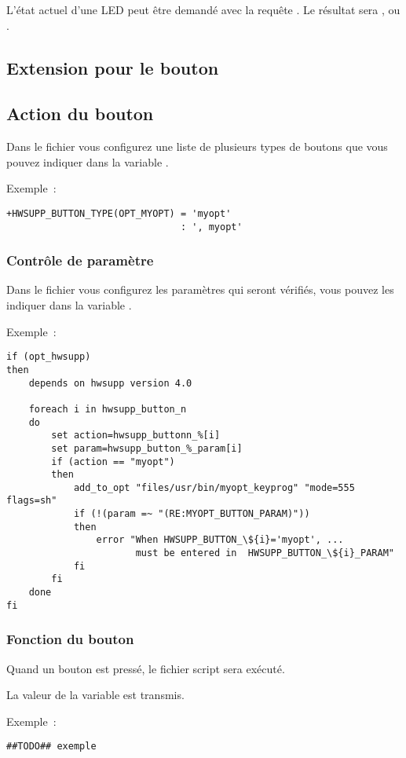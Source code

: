   L'état actuel d'une LED peut être demandé avec la requête
  . Le résultat sera
  ,  ou .

\subsection{Extension pour le bouton}
\subsection{Action du bouton}
  Dans le fichier  vous configurez une liste de plusieurs types
  de boutons que vous pouvez indiquer dans la variable .

Exemple~:
\begin{verbatim}
+HWSUPP_BUTTON_TYPE(OPT_MYOPT) = 'myopt' 
                               : ', myopt'
\end{verbatim}

\subsubsection{Contrôle de paramètre}
  Dans le fichier  vous configurez les paramètres qui seront vérifiés,
  vous pouvez les indiquer dans la variable .

Exemple~:
\begin{verbatim}
if (opt_hwsupp)
then
    depends on hwsupp version 4.0

    foreach i in hwsupp_button_n
    do
        set action=hwsupp_buttonn_%[i]
        set param=hwsupp_button_%_param[i]
        if (action == "myopt")
        then
            add_to_opt "files/usr/bin/myopt_keyprog" "mode=555 flags=sh"
            if (!(param =~ "(RE:MYOPT_BUTTON_PARAM)"))
            then
                error "When HWSUPP_BUTTON_\${i}='myopt', ...
                       must be entered in  HWSUPP_BUTTON_\${i}_PARAM" 
            fi
        fi
    done
fi
\end{verbatim}

\subsubsection {Fonction du bouton}
  Quand un bouton est pressé, le fichier script 
  sera exécuté.

  La valeur de la variable  est transmis.

Exemple~:
\begin{verbatim}
##TODO## exemple
\end{verbatim}

